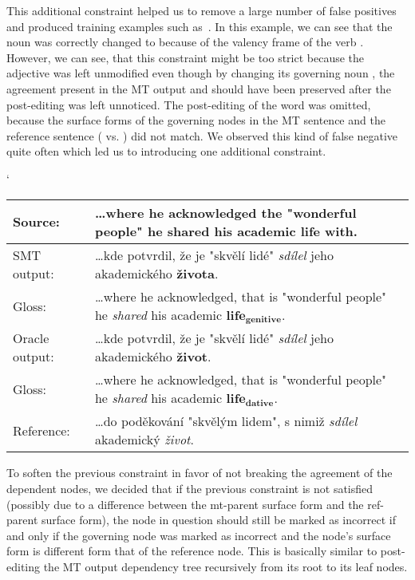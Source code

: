 This additional constraint helped us to remove a large number of false positives and produced training examples
such as~. In this example, we can see that the noun  was correctly changed
to  because of the valency frame of the verb . However, we can see, that this constraint
might be too strict because the adjective  was left unmodified even though by changing its
governing noun , the agreement present in the MT output and should have been preserved after the
post-editing was left unnoticed. The post-editing of the word  was omitted,
 because the surface forms of the governing nodes in the MT sentence and the reference sentence
( vs. ) did not match. We observed this kind of false negative quite often which
led us to introducing one additional constraint.

\begin{myexample}
    \small
    \catcode`
    \begin{center}
    \begin{tabular}{|l|p{}|}
    \hline
    \textbf{Source:}  &  \textbf{…where he acknowledged the "wonderful people" he shared his academic life with.}  \\
    \hline
    SMT output:  &  …kde potvrdil, že je "skvělí lidé" \textit{sdílel} jeho akademického \textbf{života}.  \\
    \hline
    Gloss:  &  …where he acknowledged, that is "wonderful people" he \textit{shared} his academic $\mathbf{life_{genitive}}$.  \\
    \hline
    Oracle output:  &  …kde potvrdil, že je "skvělí lidé" \textit{sdílel} jeho akademického \textbf{život}.  \\
    \hline
    Gloss:  &  …where he acknowledged, that is "wonderful people" he \textit{shared} his academic $\mathbf{life_{dative}}$.  \\
    \hline
    Reference:  &  …do poděkování "skvělým lidem", s nimiž \textit{sdílel} akademický \textit{život}.  \\
    \hline
    \end{tabular}
    \label{ex-oracle-parentref}
    \end{center}
\end{myexample}

To soften the previous constraint in favor of not breaking the agreement of the dependent nodes, we decided
that if the previous constraint is not satisfied (possibly due to a difference between the mt-parent surface form
and the ref-parent surface form), the node in question should still be marked as incorrect if and only if
the governing node was marked as incorrect and the node's surface form is different form that of the reference
node. This is basically similar to post-editing the MT output dependency tree recursively from its
root to its leaf nodes.


